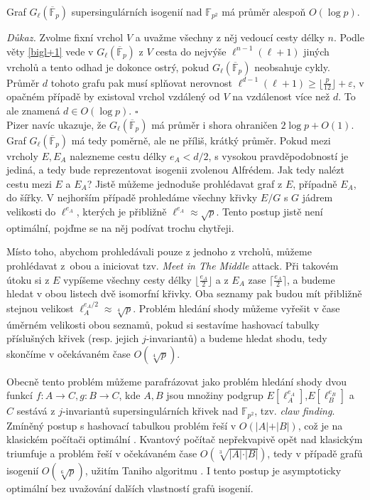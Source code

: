 \documentclass[12pt]{report}
\begin{document}
\begin{lemma*}
Graf $G_{\ell} (\overline{\mathbb{F}}_p)$ supersingulárních isogenií nad $\mathbb{F}_{p^2}$ má průměr alespoň $O(\log p)$.
\end{lemma*}
\noindent \textit{Důkaz.} Zvolme fixní vrchol $V$ a uvažme všechny z něj vedoucí cesty délky $n$. Podle věty \ref{bigl+1} vede v $G_{\ell} (\overline{\mathbb{F}}_p)$ z $V$ cesta do nejvýše $\ell^{n-1} (\ell+1)$ jiných vrcholů a tento odhad je dokonce ostrý, pokud $G_{\ell} (\overline{\mathbb{F}}_p)$ neobsahuje cykly. Průměr $d$ tohoto grafu pak musí splňovat nerovnost $\ell^{d-1} (\ell+1) \geqslant \lfloor \frac{p}{12} \rfloor + \varepsilon$, v opačném případě by existoval vrchol vzdálený od $V$ na vzdálenost více než $d$. To ale znamená $d \in O(\log p)$. \hfill $\square$\\

Pizer \cite[Thm. 1.]{Pizer} navíc ukazuje, že $G_{\ell} (\overline{\mathbb{F}}_p)$ má průměr i shora ohraničen $2 \log p + O(1)$. Graf $G_{\ell} (\overline{\mathbb{F}}_p)$ má tedy poměrně, ale ne příliš,  krátký průměr. Pokud mezi vrcholy $E,E_A$ nalezneme cestu délky $e_A < d/2$, s vysokou pravděpodobností je jediná, a tedy bude reprezentovat isogenii zvolenou Alfrédem. Jak tedy nalézt cestu mezi $E$ a $E_A$? Jistě můžeme jednoduše prohlédavat graf z $E$, případně $E_A$, do šířky. V nejhorším případě prohledáme všechny křivky $E/G$ s $G$ jádrem velikosti do $\ell^{e_A}$, kterých je přibližně $\ell^{e_A} \approx \sqrt{p}$. Tento postup jistě není optimální, pojďme se na něj podívat trochu chytřeji.

Místo toho, abychom prohledávali pouze z jednoho z vrcholů, můžeme prohlédavat z~obou a iniciovat tzv. \textit{Meet in The Middle} attack. Při takovém útoku si z $E$ vypíšeme všechny cesty délky $\lfloor \frac{e_A}{2} \rfloor$ a z $E_A$ zase $\lceil \frac{e_A}{2} \rceil$, a budeme hledat v obou listech dvě isomorfní křivky. Oba seznamy pak budou mít přibližně stejnou velikost $\ell_A ^ {e_A/2} \approx \sqrt[4]{p}$. Problém hledání shody můžeme vyřešit v čase úměrném velikosti obou seznamů, pokud si sestavíme hashovací tabulky příslušných křivek (resp. jejich $j$-invariantů) a budeme hledat shodu, tedy skončíme v očekávaném čase $O(\sqrt[4]{p})$.

Obecně tento problém můžeme parafrázovat jako problém hledání shody dvou funkcí $f : A \longrightarrow C, g : B \longrightarrow C$, kde $A,B$ jsou množiny podgrup $E[\ell_A ^{e_A}]$,$E[\ell_B ^{e_B}]$ a $C$ sestává z $j$-invariantů supersingulárních křivek nad $\mathbb{F}_{p^2}$, tzv. \textit{claw finding}. Zmíněný postup s hashovací tabulkou problém řeší v $O(\vert A\vert + \vert B \vert)$, což je na klasickém počítači optimální \cite{Shengyu}. Kvantový počítač nepřekvapivě opět nad klasickým triumfuje a problém řeší v očekávaném čase $O( \sqrt[3]{\vert A \vert \cdot \vert B \vert})$, tedy v případě grafů isogenií $O(\sqrt[6]{p})$, užitím Taniho algoritmu \cite{Tani}. I tento postup je asymptoticky optimální bez uvažování dalších vlastností grafů isogenií. 
\end{document}
